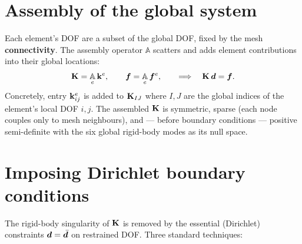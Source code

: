 \section{Assembly of the global system}

Each element's DOF are a subset of the global DOF, fixed by the mesh
\textbf{connectivity}. The assembly operator $\mathbb A$ scatters and adds
element contributions into their global locations:
\begin{equation}
  \mathbf{K} = \operatorname*{\mathbb A}_{e} \mathbf{k}^{e}, \qquad
  \bm{f} = \operatorname*{\mathbb A}_{e} \bm{f}^e, \qquad
  \Longrightarrow\quad \mathbf{K}\,\bm{d}=\bm{f} .
  \label{eq:assembly}
\end{equation}
Concretely, entry $\mathbf{k}^{e}_{ij}$ is added to $\mathbf{K}_{IJ}$ where $I,J$ are the
global indices of the element's local DOF $i,j$. The assembled $\mathbf{K}$ is
symmetric, sparse (each node couples only to mesh neighbours), and ---
before boundary conditions --- positive semi-definite with the six
global rigid-body modes as its null space.

\section{Imposing Dirichlet boundary conditions}

The rigid-body singularity of $\mathbf{K}$ is removed by the essential
(Dirichlet) constraints $\bm{d}=\bar{\bm{d}}$ on restrained DOF. Three
standard techniques:

